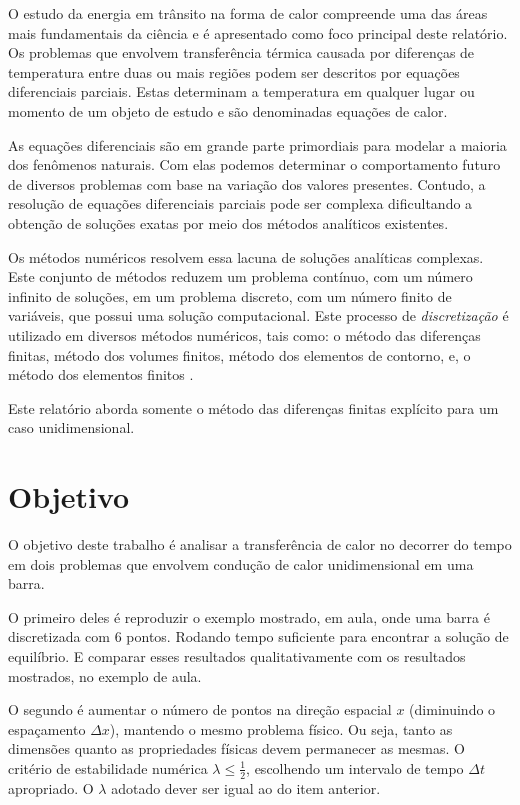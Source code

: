 \documentclass[12pt,a4paper,final]{report}%
\begin{document}
O estudo da energia em trânsito na forma de calor compreende uma das áreas mais fundamentais da ciência e é apresentado como foco principal deste relatório. Os problemas que envolvem transferência térmica causada por diferenças de temperatura entre duas ou mais regiões podem ser descritos por equações diferenciais parciais. Estas determinam a temperatura em qualquer lugar ou momento de um objeto de estudo e são denominadas equações de calor. 

As equações diferenciais são em grande parte primordiais para modelar a maioria dos fenômenos naturais. Com elas podemos determinar o comportamento futuro de diversos problemas com base na variação dos valores presentes. Contudo, a resolução de equações diferenciais parciais pode ser complexa dificultando a obtenção de soluções exatas por meio dos métodos analíticos existentes.

Os métodos numéricos resolvem essa lacuna de soluções analíticas complexas. Este conjunto de métodos reduzem um problema contínuo, com um número infinito de soluções, em um problema discreto, com um número finito de variáveis, que possui uma solução computacional. Este processo de \textit{discretização} é utilizado em diversos métodos numéricos, tais como: o método das diferenças finitas, método dos volumes finitos, método dos elementos de contorno, e, o método dos elementos finitos \citep{Melo2011}.

Este relatório aborda somente o método das diferenças finitas explícito para um caso unidimensional.  


\section*{Objetivo}

O objetivo deste trabalho é analisar a transferência de calor no decorrer do tempo em dois problemas que envolvem condução de calor unidimensional em uma barra. 

O primeiro deles é reproduzir o exemplo mostrado, em aula, onde uma barra é discretizada com 6 pontos. Rodando tempo suficiente para encontrar a solução de equilíbrio. E comparar esses resultados qualitativamente com os resultados mostrados, no exemplo de aula.

O segundo é aumentar o número de pontos na direção espacial $x$ (diminuindo o espaçamento $\Delta x$), mantendo o mesmo problema físico. Ou seja, tanto as dimensões quanto as propriedades físicas devem permanecer as mesmas. O critério de estabilidade numérica $\lambda \leq \frac{1}{2}$, escolhendo um intervalo de tempo $\Delta t$ apropriado. O $\lambda$ adotado dever ser igual ao do item anterior.
\end{document}
